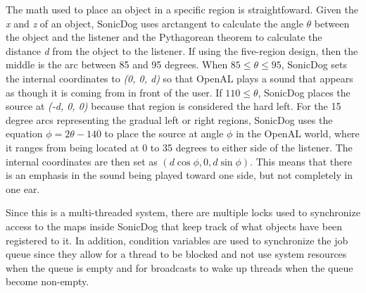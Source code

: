 The math used to place an object in a specific region is straightfoward. Given
the \emph{x} and \emph{z} of an object, SonicDog uses arctangent to calculate
the angle \begin{math}\theta\end{math} between the object and the listener and 
the Pythagorean theorem to calculate the distance \emph{d} from the object to 
the listener. If using the five-region design, then the middle is the arc 
between 85 and 95 degrees. When \begin{math}85\leq\theta\leq95\end{math}, 
SonicDog sets the internal coordinates to \emph{(0, 0, d)} so that OpenAL plays 
a sound that appears as though it is coming from in front of the user. If 
\begin{math}110\leq\theta\end{math}, SonicDog places the source at 
\emph{(-d, 0, 0)} because that region is considered the hard left. For the 15 
degree arcs representing the gradual left or right regions, SonicDog uses the 
equation \begin{math}\phi=2\theta-140\end{math} to place the source at angle 
\begin{math}\phi\end{math} in the OpenAL world, where it ranges from being 
located at 0 to 35 degrees to either side of the listener. The internal 
coordinates are then set as \begin{math}(d\cos\phi, 0, d\sin\phi)\end{math}. 
This means that there is an emphasis in the sound being played toward one side, 
but not completely in one ear.

Since this is a multi-threaded system, there are multiple locks used to 
synchronize access to the maps inside SonicDog that keep track of what objects
have been registered to it. In addition, condition variables are used to
synchronize the job queue since they allow for a thread to be blocked and not
use system resources when the queue is empty and for broadcasts to wake up
threads when the queue become non-empty.


